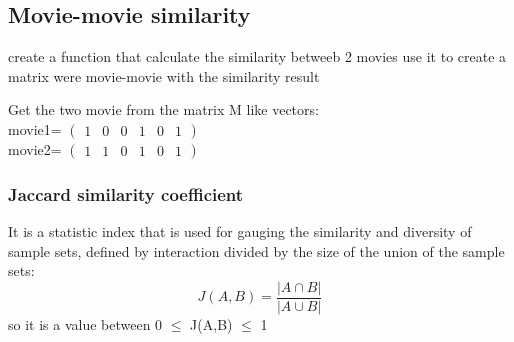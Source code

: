 \documentclass{article}
\begin{document}
\subsection{Movie-movie similarity}
create a function that calculate the similarity betweeb 2 movies 
use it to create a matrix were movie-movie with the similarity result

Get the two movie from the matrix M like vectors:\\
movie1= $\begin{pmatrix}
      1&0&0&1&0&1
\end{pmatrix}$\\
movie2= $\begin{pmatrix}
      1&1&0&1&0&1
\end{pmatrix}$
\subsubsection{Jaccard similarity coefficient}
It is a statistic index that is used for gauging the similarity and diversity of sample sets, defined by interaction divided by the size of the union of the sample sets:
\begin{equation}
      J(A,B) = \dfrac{|A\cap B|}{|A\cup B|}
\end{equation}
so it is a value between 0 $\leq$ J(A,B) $\leq$ 1
\end{document}
